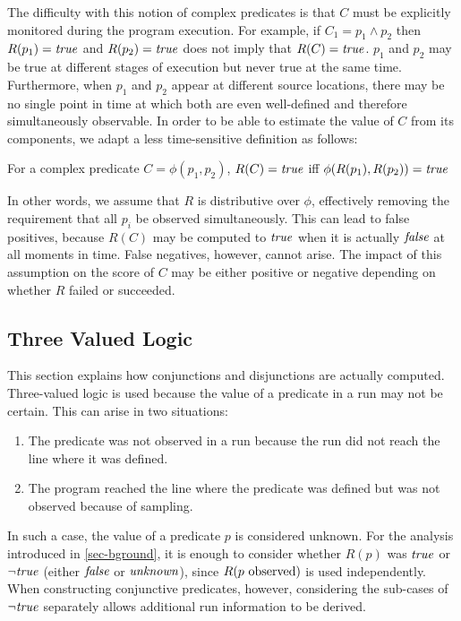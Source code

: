 The difficulty with this notion of complex predicates is that $C$ must be explicitly monitored during the program execution.  For example, if $C_1 = p_1 \wedge p_2$ then $R(p_1) = \mathit{true}$ and $R(p_2) = \mathit{true}$ does not imply that $R(C) = \mathit{true}$.  $p_1$ and $p_2$ may be true at different stages of execution but never true at the same time.  Furthermore, when $p_1$ and $p_2$ appear at different source locations, there may be no single point in time at which both are even well-defined and therefore simultaneously observable.  In order to be able to estimate the value of $C$ from its components, we adapt a less time-sensitive definition as follows:
\begin{defn}
\label{dfn2}
For a complex predicate $C = \phi(p_1, p_2)$, $R(C) = \mathit{true}$ iff $\phi(R(p_1), R(p_2)) = \mathit{true}$
\end{defn}

In other words, we assume that $R$ is distributive over $\phi$, effectively removing the requirement that all $p_i$ be observed simultaneously.  This can lead to false positives, because $R(C)$ may be computed to $\mathit{true}$ when it is actually $\mathit{false}$ at all moments in time.  False negatives, however, cannot arise.  The impact of this assumption on the score of $C$ may be either positive or negative depending on whether $R$ failed or succeeded.

\subsection{Three Valued Logic}
\label{sec-tvl}
This section explains how conjunctions and disjunctions are actually computed.  Three-valued logic is used because the value of a predicate in a run may not be certain. This can arise in two situations:
\begin{enumerate}
\item The predicate was not observed in a run because the run did not reach the line where it was defined.
\item The program reached the line where the predicate was defined but was not observed because of sampling.
\end{enumerate}

In such a case, the value of a predicate $p$ is considered unknown.  For the analysis introduced in \autoref{sec-bground}, it is enough to consider whether $R(p)$ was $\mathit{true}$ or $\neg \mathit{true}$ (either $\mathit{false}$ or $\mathit{unknown}$), since $R(\text{$p$ observed})$ is used independently.  When constructing conjunctive predicates, however, considering the sub-cases of $\neg \mathit{true}$ separately allows additional run information to be derived.

